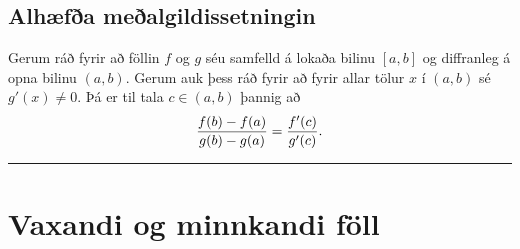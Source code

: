 \documentclass[b5paper,10pt,icelandic]{sphinxmanual}
\begin{document}
\subsection{Alhæfða meðalgildissetningin}
\label{kafli03:index-8}\label{kafli03:alhaefa-mealgildissetningin}
Gerum ráð fyrir að föllin \(f\) og \(g\) séu samfelld á lokaða
bilinu \([a,b]\) og diffranleg á opna bilinu \((a,b)\). Gerum
auk þess ráð fyrir að fyrir allar tölur \(x\) í \((a,b)\) sé
\(g'(x)\neq 0\). Þá er til tala \(c\in (a,b)\) þannig að
\begin{gather}
\begin{split}\frac{f(b)-f(a)}{g(b)-g(a)}=\frac{f'(c)}{g'(c)}.\end{split}\notag
\end{gather}

\bigskip\hrule{}\bigskip



\section{Vaxandi og minnkandi föll}
\label{kafli03:vaxandi-og-minnkandi-foll}\label{kafli03:vaxandiminnkandi}
\end{document}
